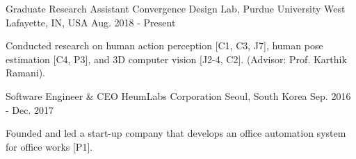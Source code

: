 \begin{cventries}
\cventry
{Graduate Research Assistant} %
{Convergence Design Lab, Purdue University} %
{West Lafayette, IN, USA} %
{Aug. 2018 - Present} %
{ %
\begin{cvitems}
\item {Conducted research on human action perception [C1, C3, J7], human pose estimation [C4, P3], and 3D computer vision [J2-4, C2]. (Advisor: Prof. Karthik Ramani).}
\end{cvitems}
}
\vspace{-.5em}

\cventry
{Software Engineer \& CEO} %
{HeumLabs Corporation} %
{Seoul, South Korea} %
{Sep. 2016 - Dec. 2017} %
{ %
\begin{cvitems}
\item {Founded and led a start-up company that develops an office automation system for office works [P1].}
\end{cvitems}
}




\end{cventries}
